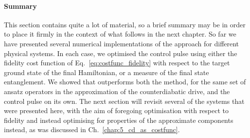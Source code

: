 \paragraph{Summary} This section contains quite a lot of material, so a brief summary may be in order to place it firmly in the context of what follows in the next chapter. So far we have presented several numerical implementations of the  approach for different physical systems. In each case, we optimised the control pulse using either the fidelity cost function of Eq.~\eqref{eq:costfunc_fidelity} with respect to the target ground state of the final Hamiltonian, or a measure of the final state entanglement. We showed that  outperforms both the  method, for the same set of ansatz operators in the approximation of the counterdiabatic drive, and the control pulse on its own. The next section will revisit several of the systems that were presented here, with the aim of foregoing optimisation with respect to fidelity and instead optimising for properties of the approximate  components instead, as was discussed in Ch.~\ref{chap:5_cd_as_costfunc}.